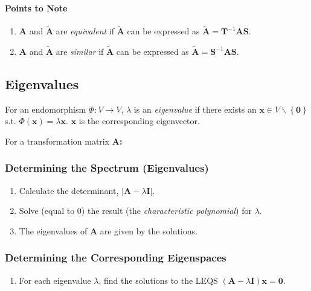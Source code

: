 \documentclass[10pt,twoside,twocolumn]{article}
\begin{document}
\paragraph{Points to Note}
\begin{enumerate}
\item $\mathbf{A}$ and $\mathbf{\tilde{A}}$ are \emph{equivalent} if $\mathbf{\tilde{A}}$
can be expressed as $\mathbf{\tilde{A}}=\mathbf{T}^{-1}\mathbf{A}\mathbf{S}$. 
\item $\mathbf{A}$ and $\mathbf{\tilde{A}}$ are \emph{similar} if $\mathbf{\tilde{A}}$
can be expressed as $\mathbf{\tilde{A}}=\mathbf{S}^{-1}\mathbf{A}\mathbf{S}$. 
\end{enumerate}

\subsection{Eigenvalues}

For an endomorphism $\Phi:V\rightarrow V$, $\lambda$ is an \emph{eigenvalue}
if there exists an $\mathbf{x}\in V\backslash\left\{ \mathbf{0}\right\} $
s.t. $\Phi\left(\mathbf{x}\right)=\lambda\mathbf{x}$. $\mathbf{x}$
is the corresponding eigenvector.

For a transformation matrix \textbf{$\mathbf{A}$:}


\subsubsection{Determining the Spectrum (Eigenvalues)}
\begin{enumerate}
\item Calculate the determinant, $\left|\mathbf{A}-\lambda\mathbf{I}\right|$. 
\item Solve (equal to 0) the result (the \emph{characteristic polynomial})
for $\lambda$. 
\item The eigenvalues of $\mathbf{A}$ are given by the solutions. 
\end{enumerate}

\subsubsection{Determining the Corresponding Eigenspaces}
\begin{enumerate}
\item For each eigenvalue $\lambda$, find the solutions to the LEQS $\left(\mathbf{A}-\lambda\mathbf{I}\right)\mathbf{x}=\mathbf{0}$. 
\end{enumerate}
\end{document}
